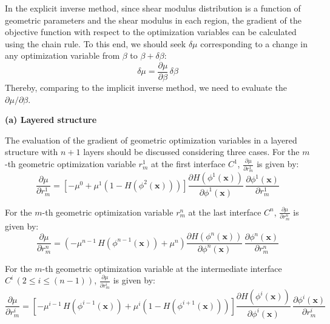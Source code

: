 \documentclass[11pt]{article}
\begin{document}
In the explicit inverse method, since shear modulus distribution is a
function of geometric parameters and the shear modulus in each
region, the gradient of the objective function with respect to the
optimization variables can be calculated using the chain rule. To
this end, we should seek $\delta\mu$ corresponding to a change in any
optimization variable from $\beta$ to $\beta + \delta\beta$:
\begin{equation}
\delta\mu = \frac{\partial\mu}{\partial\beta}\,\delta\beta
\end{equation}
Thereby, comparing to the implicit inverse method, we need to
evaluate the $\partial\mu / \partial\beta$.

\medskip
\noindent
\textbf{(a) Layered structure}

\medskip
\noindent
The evaluation of the gradient of geometric optimization variables in
a layered structure with $n + 1$ layers should be discussed
considering three cases. For the $m$-th geometric optimization
variable $r^{1}_{m}$ at the first interface $C^{1}$,
$\frac{\partial\mu}{\partial r^{1}_{m}}$ is given by:
\begin{equation}
\frac{\partial\mu}{\partial r^{1}_{m}}
= \left[-\mu^{0} + \mu^{1}\!\left(1 - H\!\left(\phi^{2}(\mathbf{x})\right)\right)\right]
  \frac{\partial H\!\left(\phi^{1}(\mathbf{x})\right)}{\partial\phi^{1}(\mathbf{x})}\,
  \frac{\partial\phi^{1}(\mathbf{x})}{\partial r^{1}_{m}}
\end{equation}

For the $m$-th geometric optimization variable $r^{n}_{m}$ at the
last interface $C^{n}$,
$\frac{\partial\mu}{\partial r^{n}_{m}}$ is given by:
\begin{equation}
\frac{\partial\mu}{\partial r^{n}_{m}}
= \left(-\mu^{n-1}\, H\!\left(\phi^{n-1}(\mathbf{x})\right) + \mu^{n}\right)
  \frac{\partial H\!\left(\phi^{n}(\mathbf{x})\right)}{\partial\phi^{n}(\mathbf{x})}\,
  \frac{\partial\phi^{n}(\mathbf{x})}{\partial r^{n}_{m}}
\end{equation}

For the $m$-th geometric optimization variable at the intermediate
interface $C^{i}\,(2 \leq i \leq (n-1))$,
$\frac{\partial\mu}{\partial r^{i}_{m}}$ is given by:
\begin{equation}
\frac{\partial\mu}{\partial r^{i}_{m}}
= \left[-\mu^{i-1}\, H\!\left(\phi^{i-1}(\mathbf{x})\right)
        + \mu^{i}\!\left(1 - H\!\left(\phi^{i+1}(\mathbf{x})\right)\right)\right]
  \frac{\partial H\!\left(\phi^{i}(\mathbf{x})\right)}{\partial\phi^{i}(\mathbf{x})}\,
  \frac{\partial\phi^{i}(\mathbf{x})}{\partial r^{i}_{m}}
\end{equation}
\end{document}
